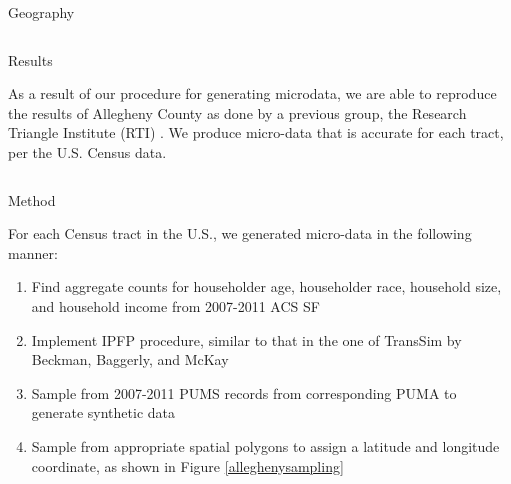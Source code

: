 \documentclass[final]{beamer}
\newlength{\onecolwid}
\newlength{\twocolwid}
\begin{document}
\begin{frame}[t]
\begin{columns}[t]
\begin{column}{\twocolwid}
\begin{columns}[t,totalwidth=\twocolwid]
\begin{column}{\onecolwid}
\begin{block}{Geography}
\end{block}


\end{column} %

\end{columns} %


\begin{alertblock}{Results}

As a result of our procedure for generating microdata, we are able to reproduce the results of Allegheny County as done by a previous group, the Research Triangle Institute (RTI) \cite{rtisynthpopv1}.  We produce micro-data that is accurate for each tract, per the U.S. Census data.
\end{alertblock} 


\begin{columns}[t,totalwidth=\twocolwid] %

\begin{column}{\onecolwid} %


\begin{block}{Method}

For each Census tract in the U.S., we generated micro-data in the following manner:
  
\begin{enumerate}
\item Find aggregate counts for householder age, householder race, household size, and household income from 2007-2011 ACS SF
\item Implement IPFP procedure, similar to that in the one of TransSim by Beckman, Baggerly, and McKay \cite{beckman.baggerly.mckay96}
\item Sample from 2007-2011  PUMS records from corresponding PUMA to generate synthetic data
\item Sample from appropriate spatial polygons to assign a latitude and longitude coordinate, as shown in Figure \ref{alleghenysampling}


\end{enumerate}
\end{block}
\end{column}
\end{columns}
\end{column}
\end{columns}
\end{frame}
\end{document}
